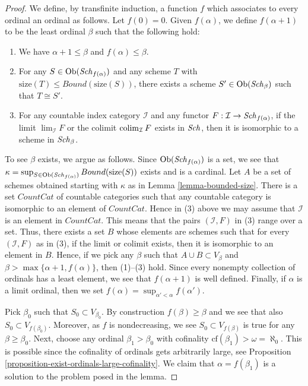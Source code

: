 \begin{proof}
We define, by transfinite induction, a function $f$ which associates
to every ordinal an ordinal as follows. Let $f(0) = 0$.
Given $f(\alpha)$, we define $f(\alpha + 1)$ to be the least
ordinal $\beta$ such that the following hold:
\begin{enumerate}
\item We have $\alpha + 1 \leq \beta$ and $f(\alpha) \leq \beta$.
\item For any $S \in \mathop{\mathrm{Ob}}\nolimits(\mathit{Sch}_{f(\alpha)})$ and any
scheme $T$ with $\text{size}(T) \leq Bound(\text{size}(S))$,
there exists a scheme $S' \in \mathop{\mathrm{Ob}}\nolimits(\mathit{Sch}_\beta)$
such that $T \cong S'$.
\item For any countable index category $\mathcal{I}$ and
any functor $F : \mathcal{I} \to \mathit{Sch}_{f(\alpha)}$, if
the limit $\lim_\mathcal{I} F$ or the colimit
$\mathop{\mathrm{colim}}\nolimits_\mathcal{I} F$ exists in $\mathit{Sch}$,
then it is isomorphic to a scheme in $\mathit{Sch}_\beta$.
\end{enumerate}
To see $\beta$ exists, we argue as follows. Since
$\mathop{\mathrm{Ob}}\nolimits(\mathit{Sch}_{f(\alpha)})$ is a set, we see that
$\kappa =
\sup_{S \in \mathop{\mathrm{Ob}}\nolimits(\mathit{Sch}_{f(\alpha)})} Bound(\text{size}(S))$
exists and is a cardinal.
Let $A$ be a set of schemes obtained starting with $\kappa$
as in Lemma \ref{lemma-bounded-size}.
There is a set $CountCat$ of countable
categories such that any countable category is isomorphic to
an element of $CountCat$. Hence in (3) above we may assume
that $\mathcal{I}$ is an element in $CountCat$. This means that
the pairs $(\mathcal{I}, F)$ in (3) range over a set.
Thus, there exists a set $B$ whose elements are schemes
such that for every $(\mathcal{I}, F)$ as in (3), if the
limit or colimit exists, then it is isomorphic to an element in $B$.
Hence, if we pick any $\beta$ such that $A \cup B \subset V_\beta$
and $\beta > \max\{\alpha + 1, f(\alpha)\}$, then (1)--(3) hold.
Since every nonempty collection of ordinals has a least element,
we see that $f(\alpha + 1)$ is well defined. Finally, if $\alpha$
is a limit ordinal, then we set
$f(\alpha) = \sup_{\alpha' < \alpha} f(\alpha')$.

\medskip\noindent
Pick $\beta_0$ such that $S_0 \subset V_{\beta_0}$.
By construction $f(\beta) \geq \beta$ and we see that
also $S_0 \subset V_{f(\beta_0)}$. Moreover, as $f$ is
nondecreasing, we see $S_0 \subset V_{f(\beta)}$ is true for any
$\beta \geq \beta_0$.
Next, choose any ordinal $\beta_1 > \beta_0$ with cofinality
$\text{cf}(\beta_1) > \omega = \aleph_0$. This is possible
since the cofinality of ordinals gets arbitrarily large, see
Proposition \ref{proposition-exist-ordinals-large-cofinality}.
We claim that
$\alpha = f(\beta_1)$ is a solution to the problem posed in the lemma.


\end{proof}
